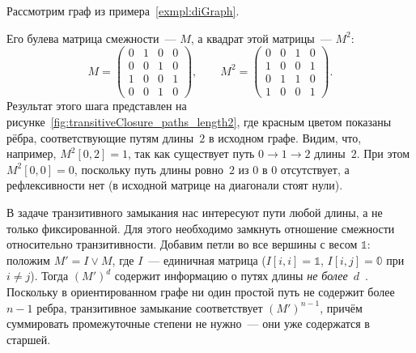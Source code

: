  \begin{example}
     \label{exmpl:transitiveClosure}
     Рассмотрим граф из примера~\ref{exmpl:diGraph}.

     \begin{marginfigure}
         \resizebox{\marginparwidth}{!}{}
         \caption{Исходные рёбра графа (чёрным) и пути длины~$2$ (красным)}
         \label{fig:transitiveClosure_paths_length2}
     \end{marginfigure}

     Его булева матрица смежности~--- $M$, а квадрат этой матрицы~--- $M^2$:
     \[
         M = \begin{pmatrix}
             0 & 1 & 0 & 0 \\
             0 & 0 & 1 & 0 \\
             1 & 0 & 0 & 1 \\
             0 & 0 & 1 & 0
         \end{pmatrix},\qquad
         M^2 = \begin{pmatrix}
             0 & 0 & 1 & 0 \\
             1 & 0 & 0 & 1 \\
             0 & 1 & 1 & 0 \\
             1 & 0 & 0 & 1
         \end{pmatrix}.
     \]
     Результат этого шага представлен на рисунке~\ref{fig:transitiveClosure_paths_length2}, где красным цветом показаны рёбра, соответствующие путям длины~$2$ в исходном графе.
     Видим, что, например, $M^2[0,2] = 1$, так как существует путь $0 \to 1 \to 2$ длины~$2$.
     При этом $M^2[0,0] = 0$, поскольку путь длины ровно~$2$ из $0$ в $0$ отсутствует, а рефлексивности нет (в исходной матрице на диагонали стоят нули).
 \end{example}

 В задаче транзитивного замыкания нас интересуют пути любой длины, а не только фиксированной.
 Для этого необходимо замкнуть отношение смежности относительно транзитивности.
 Добавим петли во все вершины с весом $\Bbbone$: положим $M' = I \lor M$, где $I$~--- единичная матрица ($I[i,i] = \Bbbone$, $I[i,j] = \Bbbzero$ при $i \neq j$).
 Тогда $(M')^d$ содержит информацию о путях длины \emph{не более}~$d$~.
 Поскольку в ориентированном графе ни один простой путь не содержит более $n-1$ ребра, транзитивное замыкание соответствует $(M')^{n-1}$, причём суммировать промежуточные степени не нужно~--- они уже содержатся в старшей.

